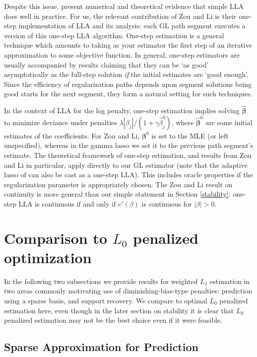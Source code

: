 \documentclass[12pt]{article}
\newcommand{\bs}[1]{\boldsymbol{#1}}
\begin{document}
Despite this issue, \citet{zou_one-step_2008} present numerical and
theoretical evidence that simple LLA does well in practice. For us, the
relevant contribution of Zou and Li is their one-step implementation of LLA
and its analysis: each GL path segment executes a version of this one-step LLA
algorithm. One-step estimation is a general technique
\citep[e.g.,][]{bickel_one-step_1975} which amounts to taking as your estimator
the first step of an iterative approximation to some objective function.   In
general, one-step estimators are usually accompanied by results claiming that
they can be `as good' asymptotically as the full-step solution {\it if} the
initial estimates are `good enough'.  Since the efficiency of regularization
paths depends upon segment solutions being good starts for the next segment,
they form a natural setting for such techniques.

In the context of LLA for the log penalty, one-step estimation implies solving
$\bs{\hat\beta}$ to minimize deviance under  penalties $\lambda|\beta_j|/(1 +
\gamma \hat\beta_j^0)$, where $\bs{\hat\beta}^0$ are some initial estimates of
the coefficients.  For Zou and Li, $\bs{\beta}^0$ is set to the
MLE (or left unspecified), whereas in  the gamma lasso we set it to the
previous path segment's estimate. The theoretical framework of one-step
estimation, and results from  Zou and Li in particular, apply
directly to our GL estimator (note that the adaptive lasso of
\citet{zou_adaptive_2006} can also be cast as a one-step LLA). This includes
oracle properties if the regularization parameter is appropriately chosen. The
Zou and Li result on continuity is  more general than our
simple statement in Section \ref{stability}:  one-step LLA is continuous if
and only if $c'(\beta)$ is continuous for $|\beta|>0$.  

\section{Comparison to $L_0$ penalized optimization}

In the following two subsections we provide results for weighted $L_1$ estimation in two areas commonly motivating use of diminishing-bias-type penalties: prediction using a sparse basis, and support recovery.  We compare to optimal $L_0$ penalized estimation here, even though in the later section on stability it is clear that $L_0$ penalized estimation may not be the best choice even if it were feasible.


\subsection{Sparse Approximation for Prediction}
\end{document}
